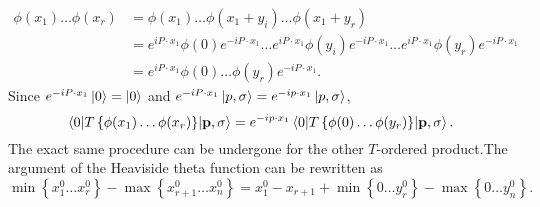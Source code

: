 \documentclass{article}
\numberwithin{equation}{section}
\begin{document}
\begin{equation}
\begin{aligned}
    \phi\left(x_1\right) \ldots \phi\left(x_r\right) & =\phi\left(x_1\right) \ldots \phi\left(x_1+y_i\right) \ldots \phi\left(x_1+y_r\right) \\
    & =e^{i P \cdot x_1} \phi(0) e^{-i P \cdot x_1} \ldots e^{i P \cdot x_1} \phi\left(y_i\right) e^{-i P \cdot x_1} \ldots e^{i P \cdot x_1} \phi\left(y_r\right) e^{-i P \cdot x_1} \\
    &= e^{i P \cdot x_1} \phi(0) \dots \phi(y_r) e^{-i P \cdot x_1}.
\end{aligned}
\end{equation}
Since $e^{-iP \cdot x_1}\ket{0} = \ket{0}$ and $e^{-iP \cdot x_1}\ket{p, \sigma} = e^{-ip \cdot x_1}\ket{p, \sigma}$,
\begin{equation} \label{eq:x_to_y_mel}
    \mel{0}{T\left\{\phi(x_1) \dots \phi(x_r)\right\}}{\vb{p}, \sigma} = e^{-ip \cdot x_1} \mel{0}{T\left\{\phi(0) \dots \phi(y_r)\right\}}{\vb{p}, \sigma}.
\end{equation}
The exact same procedure can be undergone for the other $T$-ordered product.The argument of the Heaviside theta function can be rewritten as 
\begin{equation}
    \min\left\{x_1^0 \dots x_r^0\right\} - \max\left\{x_{r+1}^0 \dots x_n^0 \right\} = x_1^0 - x_{r+1} + \min\left\{0 \dots y_r^0\right\} - \max\left\{0 \dots y_n^0\right\}.
\end{equation}
\end{document}
